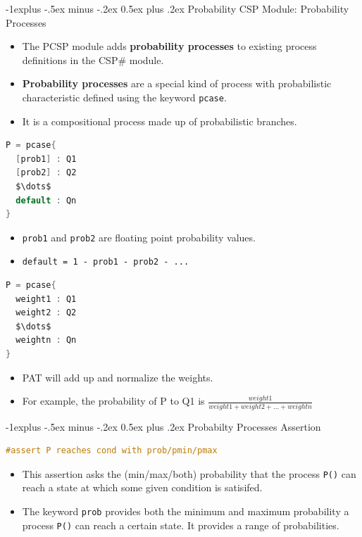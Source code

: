 \documentclass[10pt, landscape]{article}
\makeatletter
\renewcommand{\subsection}{\@startsection{subsection}{2}{0mm}%
  {-1explus -.5ex minus -.2ex}%
  {0.5ex plus .2ex}%
{\normalfont\normalsize\bfseries}}
\makeatother
\begin{document}
\begin{multicols*}{3}
  \subsection{Probability CSP Module: Probability Processes}
  \begin{itemize}
    \item The PCSP module adds \textbf{probability processes} to existing process definitions in the CSP\# module.
    \item \textbf{Probability processes} are a special kind of process with probabilistic characteristic defined using the keyword \texttt{pcase}.
    \item It is a compositional process made up of probabilistic branches.
  \end{itemize}
  \begin{multicols*}{2}
\begin{lstlisting}[language=C, basicstyle=\scriptsize\selectfont\ttfamily, mathescape]
P = pcase{
  [prob1] : Q1
  [prob2] : Q2
  $\dots$
  default : Qn
}
\end{lstlisting}
    \begin{itemize}
      \item \texttt{prob1} and \texttt{prob2} are floating point probability values.
      \item \texttt{default = 1 - prob1 - prob2 - ...}
    \end{itemize}
\begin{lstlisting}[language=C, basicstyle=\scriptsize\selectfont\ttfamily, mathescape]
P = pcase{
  weight1 : Q1
  weight2 : Q2
  $\dots$
  weightn : Qn
}
\end{lstlisting}
    \begin{itemize}
      \item PAT will add up and normalize the weights.
      \item For example, the probability of P to Q1 is $\frac{weight1}{weight1 + weight2 + \dots + weightn}$
    \end{itemize}
  \end{multicols*}

  \subsection{Probabilty Processes Assertion}
\begin{lstlisting}[language=C, basicstyle=\scriptsize\selectfont\ttfamily, mathescape]
#assert P reaches cond with prob/pmin/pmax
\end{lstlisting}
  \begin{itemize}
    \item This assertion asks the (min/max/both) probability that the process \texttt{P()} can reach a state at which some given condition is satisifed.
    \item The keyword \texttt{prob} provides both the minimum and maximum probability a process \texttt{P()} can reach a certain state. It provides a range of probabilities.
  \end{itemize}


\end{multicols*}
\end{document}
